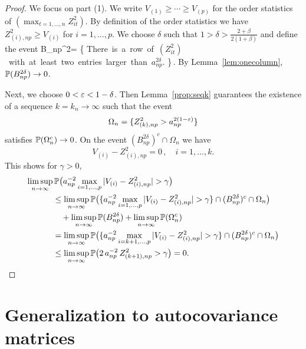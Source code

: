 \begin{proof}
We focus on part (1). We write 
$V_{(1)}\ge \cdots \ge V_{(p)}$ for the order statistics of $(\max_{t=1,\ldots,n}Z_{it}^2)$. By definition of the order statistics we have $Z_{(i),np}^2\ge V_{(i)}$ for $i=1,\ldots,p$. We choose $\delta$ such that $1>\delta >\frac{2+\beta}{2(1+\beta)}$ and define the event
\beao
B_{np}^{2\delta}= \{ \mbox{There is a row of $(Z_{it}^2)$ with at least two entries larger than $a_{np}^{2\delta}$.} \}\,.
\eeao
By Lemma~\ref{lem:onecolumn}, $\P(B_{np}^{2\delta})\to 0$. 

Next, we choose $0<\vep < 1-\delta$. Then Lemma~\ref{prop:seqk} guarantees the existence of a sequence $k=k_n \to \infty$ such that the event 
\begin{equation*}
\Omega_n = \{ Z_{(k),np}^2 > a_{np}^{2(1-\vep)} \}
\end{equation*}
satisfies $\P(\Omega_n^c)\to 0$. On the event $(B_{np}^{2\delta})^c \cap \Omega_n$ we have 
\begin{equation*}
V_{(i)}-Z_{(i),np}^2=0\,, \quad i=1,\ldots,k.
\end{equation*}
This shows for $\gamma>0$,
\begin{equation*}
\begin{split}
\limsup_{\nto}& \,\P\big(a_{np}^{-2}\max_{i=1,\ldots,p} |V_{(i)}-Z_{(i),np}^2|>\gamma\big)\\
&\le \limsup_{\nto}\P\big(\{a_{np}^{-2}\max_{i=1,\ldots,p} |V_{(i)}-Z_{(i),np}^2|>\gamma\}\cap (B_{np}^{2\delta})^c \cap \Omega_n\big)\\
&\quad + \limsup_{\nto} \P(B_{np}^{2\delta})  +\limsup_{\nto} \P(\Omega_n^c)\\
&= \limsup_{\nto}\P\big(\{a_{np}^{-2}\max_{i=k+1,\ldots,p} |V_{(i)}-Z_{(i),np}^2|>\gamma\}\cap (B_{np}^{2\delta})^c \cap \Omega_n\big)\\
&\le \limsup_{\nto}\P\big( 2 \, a_{np}^{-2} \,Z_{(k+1),np}^2 >\gamma \big) =0.
\end{split}
\end{equation*}
\end{proof}



\section{Generalization to autocovariance matrices}\label{sec:autocov}

